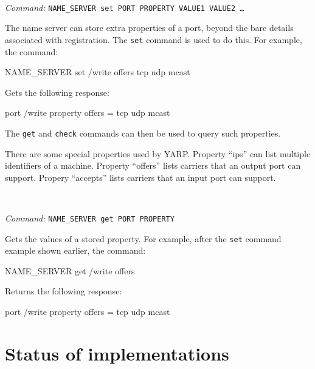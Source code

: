 \documentclass[a4]{article}
\newenvironment{codecase}[1]{\subsection{#1}}{}
\newenvironment{packed_itemize}{
\begin{itemize}
  \renewcommand{\labelitemi}{$\triangleright$}
  \setlength{\itemsep}{1pt}
  \setlength{\parskip}{0pt}
  \setlength{\parsep}{0pt}
}{\end{itemize}}
\newcommand{\newusage}{\ \\\noindent\makebox[\textwidth]{\hrulefill}}
\newcommand{\usage}[1]{ \begin{packed_itemize} \item {\it Command:} {\tt #1} \end{packed_itemize}}
\begin{document}
\newusage{}
\usage{NAME\_SERVER set PORT PROPERTY VALUE1 VALUE2 \ldots}

The name server can store extra properties of a port, beyond the
bare details associated with registration.  The {\tt set} command
is used to do this.  For example, the command:
\begin{code}
NAME_SERVER set /write offers tcp udp mcast
\end{code}
Gets the following response:
\begin{code}
port /write property offers = tcp udp mcast
\end{code}
The {\tt get} and {\tt check} commands can then be used to query
such properties.

There are some special properties used by YARP.  Property ``ips''
can list multiple identifiers of a machine.  Property ``offers''
lists carriers that an output port can support.  Propery ``accepts''
lists carriers that an input port can support.




\newusage
\usage{NAME\_SERVER get PORT PROPERTY}
Gets the values of a stored property. For example, 
after the {\tt set} command example shown earlier, the command:
\begin{code}
NAME_SERVER get /write offers
\end{code}
Returns the following response:
\begin{code}
port /write property offers = tcp udp mcast
\end{code}









\section{Status of implementations}
\end{document}
